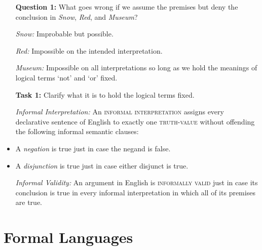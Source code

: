 \documentclass[a4paper, 11pt]{article} %
\begin{document}
\begin{itemize}[leftmargin=1in,labelsep=.15in]
  \item[\bf Question 1:] What goes wrong if we assume the premises but deny the conclusion in \textit{Snow}, \textit{Red}, and \textit{Museum}?
  \item[\it Snow:] Improbable but possible.
  \item[\it Red:] Impossible on the intended interpretation.
  \item[\it Museum:] Impossible on all interpretations so long as we hold the meanings of logical terms `not' and `or' fixed. 
  \item[\bf Task 1:] Clarify what it is to hold the logical terms fixed.
  \item[\it Informal Interpretation:] An \textsc{informal interpretation} assigns every declarative sentence of English to exactly one \textsc{truth-value} without offending the following informal semantic clauses:
    \item A \textit{negation} is true just in case the negand is false.
    \item A \textit{disjunction} is true just in case either disjunct is true.
  \item[\it Informal Validity:] An argument in English is \textsc{informally valid} just in case its conclusion is true in every informal interpretation in which all of its premises are true.
\end{itemize}





\section*{Formal Languages}
\end{document}
